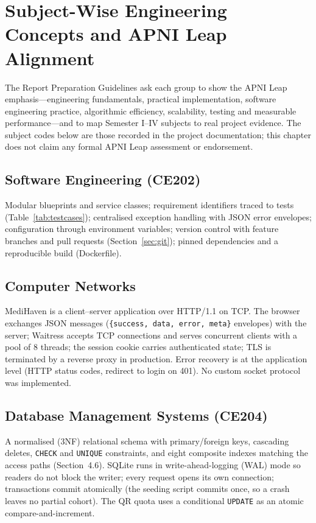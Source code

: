 \chapter{Subject-Wise Engineering Concepts and APNI Leap Alignment}
\label{ch:subjects}

The Report Preparation Guidelines ask each group to show the APNI Leap emphasis---engineering fundamentals,
practical implementation, software engineering practice, algorithmic efficiency, scalability, testing and
measurable performance---and to map Semester I--IV subjects to real project evidence. The subject codes
below are those recorded in the project documentation; this chapter does not claim any formal APNI Leap
assessment or endorsement.

\section{Software Engineering (CE202)}
Modular blueprints and service classes; requirement identifiers traced to tests (Table~\ref{tab:testcases});
centralised exception handling with JSON error envelopes; configuration through environment variables;
version control with feature branches and pull requests (Section~\ref{sec:git}); pinned dependencies and
a reproducible build (Dockerfile).

\section{Computer Networks}
MediHaven is a client--server application over HTTP/1.1 on TCP. The browser exchanges JSON messages
(\texttt{\{success, data, error, meta\}} envelopes) with the server; Waitress accepts TCP connections and
serves concurrent clients with a pool of 8 threads; the session cookie carries authenticated state; TLS is
terminated by a reverse proxy in production. Error recovery is at the application level (HTTP status codes,
redirect to login on 401). No custom socket protocol was implemented.

\section{Database Management Systems (CE204)}
A normalised (3NF) relational schema with primary/foreign keys, cascading deletes, \texttt{CHECK} and
\texttt{UNIQUE} constraints, and eight composite indexes matching the access paths (Section~4.6). SQLite
runs in write-ahead-logging (WAL) mode so readers do not block the writer; every request opens its own
connection; transactions commit atomically (the seeding script commits once, so a crash leaves no partial
cohort). The QR quota uses a conditional \texttt{UPDATE} as an atomic compare-and-increment.

